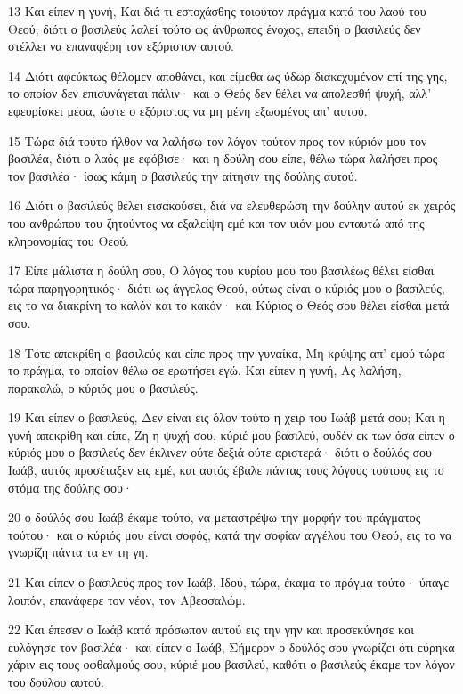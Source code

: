 \par 13 Και είπεν η γυνή, Και διά τι εστοχάσθης τοιούτον πράγμα κατά του λαού του Θεού; διότι ο βασιλεύς λαλεί τούτο ως άνθρωπος ένοχος, επειδή ο βασιλεύς δεν στέλλει να επαναφέρη τον εξόριστον αυτού.
\par 14 Διότι αφεύκτως θέλομεν αποθάνει, και είμεθα ως ύδωρ διακεχυμένον επί της γης, το οποίον δεν επισυνάγεται πάλιν· και ο Θεός δεν θέλει να απολεσθή ψυχή, αλλ' εφευρίσκει μέσα, ώστε ο εξόριστος να μη μένη εξωσμένος απ' αυτού.
\par 15 Τώρα διά τούτο ήλθον να λαλήσω τον λόγον τούτον προς τον κύριόν μου τον βασιλέα, διότι ο λαός με εφόβισε· και η δούλη σου είπε, θέλω τώρα λαλήσει προς τον βασιλέα· ίσως κάμη ο βασιλεύς την αίτησιν της δούλης αυτού.
\par 16 Διότι ο βασιλεύς θέλει εισακούσει, διά να ελευθερώση την δούλην αυτού εκ χειρός του ανθρώπου του ζητούντος να εξαλείψη εμέ και τον υιόν μου ενταυτώ από της κληρονομίας του Θεού.
\par 17 Είπε μάλιστα η δούλη σου, Ο λόγος του κυρίου μου του βασιλέως θέλει είσθαι τώρα παρηγορητικός· διότι ως άγγελος Θεού, ούτως είναι ο κύριός μου ο βασιλεύς, εις το να διακρίνη το καλόν και το κακόν· και Κύριος ο Θεός σου θέλει είσθαι μετά σου.
\par 18 Τότε απεκρίθη ο βασιλεύς και είπε προς την γυναίκα, Μη κρύψης απ' εμού τώρα το πράγμα, το οποίον θέλω σε ερωτήσει εγώ. Και είπεν η γυνή, Ας λαλήση, παρακαλώ, ο κύριός μου ο βασιλεύς.
\par 19 Και είπεν ο βασιλεύς, Δεν είναι εις όλον τούτο η χειρ του Ιωάβ μετά σου; Και η γυνή απεκρίθη και είπε, Ζη η ψυχή σου, κύριέ μου βασιλεύ, ουδέν εκ των όσα είπεν ο κύριός μου ο βασιλεύς δεν έκλινεν ούτε δεξιά ούτε αριστερά· διότι ο δούλός σου Ιωάβ, αυτός προσέταξεν εις εμέ, και αυτός έβαλε πάντας τους λόγους τούτους εις το στόμα της δούλης σου·
\par 20 ο δούλός σου Ιωάβ έκαμε τούτο, να μεταστρέψω την μορφήν του πράγματος τούτου· και ο κύριός μου είναι σοφός, κατά την σοφίαν αγγέλου του Θεού, εις το να γνωρίζη πάντα τα εν τη γη.
\par 21 Και είπεν ο βασιλεύς προς τον Ιωάβ, Ιδού, τώρα, έκαμα το πράγμα τούτο· ύπαγε λοιπόν, επανάφερε τον νέον, τον Αβεσσαλώμ.
\par 22 Και έπεσεν ο Ιωάβ κατά πρόσωπον αυτού εις την γην και προσεκύνησε και ευλόγησε τον βασιλέα· και είπεν ο Ιωάβ, Σήμερον ο δούλός σου γνωρίζει ότι εύρηκα χάριν εις τους οφθαλμούς σου, κύριέ μου βασιλεύ, καθότι ο βασιλεύς έκαμε τον λόγον του δούλου αυτού.
